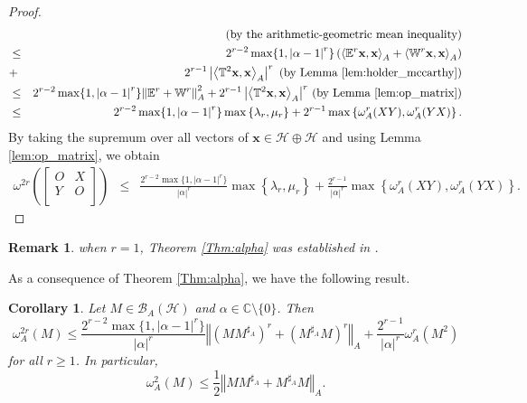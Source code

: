 \documentclass{article}
\newcommand{\bra}[1]{\left(#1\right)}
\newcommand{\seqA}[1]{{\left<#1\right>}_{A}}
\newcommand{\normA}[1]{{\left\Vert#1\right\Vert}_{A}}
\newcommand{\abs}[1]{\left\vert#1\right\vert}
\newcommand{\set}[1]{\left\{#1\right\}}
\renewcommand{\c}{\mathbb C}
\newcommand{\hh}{\mathcal{H}\oplus\mathcal{H}}
\newcommand {\W}{\mathbb{W}}
\newcommand {\E}{\mathbb{E}}
\newcommand {\Ma}{M^{\sharp_{A}}}
\newcommand {\T}{\mathbb{T}}
\newcommand {\h}{\mathcal{H}}
\renewcommand {\b}{\mathcal{B}}
\newtheorem{corollary}[theorem]{Corollary}
\newtheorem{remark}[theorem]{Remark}
\begin{document}
\begin{proof}
\begin{eqnarray*}
  &&\bra{\mbox{by the arithmetic-geometric mean inequality}}\\
  &\leq& 2^{r-2}\max\{1,\abs{\alpha-1}^{r}\}\bra{\seqA{\E^r\mathbf{x},\mathbf{x}}
  +\seqA{\W^r\mathbf{x},\mathbf{x}}}\\
  &+&2^{r-1}\abs{\seqA{\T^2\mathbf{x},\mathbf{x}}}^{r}\,\,\bra{\mbox{by Lemma \ref{lem:holder_mccarthy}}}\\
   &\leq& 2^{r-2}\max\{1,\abs{\alpha-1}^{r}\}\normA{\E^r+\W^r}^2+2^{r-1}\abs{\seqA{\T^2\mathbf{x},\mathbf{x}}}^{r}\,\bra{\mbox{by Lemma \ref{lem:op_matrix}}}\\
   &\leq&2^{r-2}\max\{1,\abs{\alpha-1}^{r}\}\max\set{\lambda_r, \mu_r}+2^{r-1}\max\set{\omega_A^{r}(XY),\omega_A^{r}(YX)}.
   \end{eqnarray*}
  By taking the supremum over all vectors of $\mathbf{x}\in\hh$ and using Lemma \ref{lem:op_matrix}, we obtain
\begin{eqnarray*}
  \omega^{2r}\bra{\begin{bmatrix} O& X\\ Y& O \\\end{bmatrix}}&\leq& \frac{2^{r-2}\max\{1,\abs{\alpha-1}^{r}\}}{\abs{\alpha}^{r}}\max\set{\lambda_r,\mu_r}
  +\frac{2^{r-1}}{\abs{\alpha}^{r}}\max\set{\omega_A^{r}(XY),\omega_A^{r}(YX)}.
\end{eqnarray*}
 \end{proof}
 \begin{remark} when $r=1$, Theorem \ref{Thm:alpha} was established in \cite[Theorem 2.4]{KZ}.
 \end{remark}
 As a consequence of Theorem \ref{Thm:alpha}, we have the following result.
 \begin{corollary} Let $M\in\b_A(\h)$ and $\alpha\in\c\setminus\{0\}$. Then
 \begin{equation}\label{Eq:alpha}
   \omega_A^{2r}(M)\leq \frac{2^{r-2}\max\{1,\abs{\alpha-1}^{r}\}}{\abs{\alpha}^{r}}\normA{(M\Ma)^r+(\Ma M)^r}
   +\frac{2^{r-1}}{\abs{\alpha}^{r}}\omega_A^{r}(M^2)
 \end{equation}
 for all $r\geq 1$. In particular,
 \begin{equation}\label{Eq:alpha-1}
   \omega_A^{2}(M)\leq \frac{1}{2} \normA{M\Ma+\Ma M}.
 \end{equation}
 \end{corollary}
\end{document}
